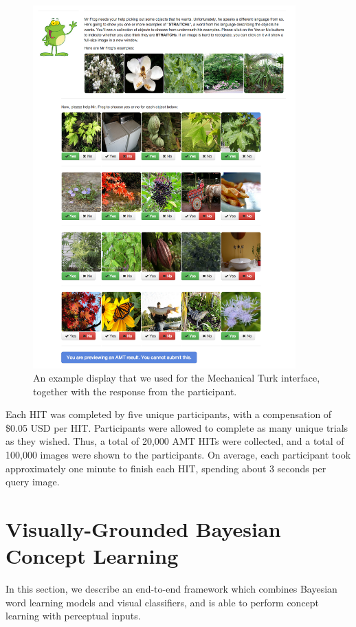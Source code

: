 \begin{figure}
  \centering
  \includegraphics[width=0.9\textwidth]{figs/vcl/amt/amt_page_with_result.png}
  \caption{An example display that we used for the Mechanical Turk interface, together with the response from the participant.}\label{fig:mrfrog}
\end{figure}

Each HIT was completed by five unique participants, with a compensation of \$0.05 USD per HIT. Participants were allowed to complete as many unique trials as they wished. Thus, a total of 20,000 AMT HITs were collected, and a total of 100,000 images were shown to the participants. On average, each participant took approximately one minute to finish each HIT, spending about 3 seconds per query image.


\section{Visually-Grounded Bayesian Concept Learning}

In this section, we describe an end-to-end framework which combines Bayesian word learning models and visual classifiers, and is able to perform concept learning with perceptual inputs. 

